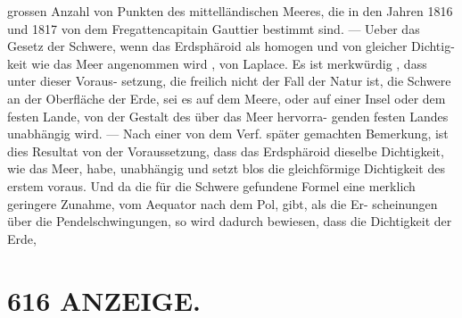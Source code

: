 \documentclass[12pt,a4paper]{article}
\begin{document}
{{{{{{{{grossen  Anzahl  von  Punkten  des mittelländischen  Meeres,  die  in  den  Jahren  1816  und  1817  von  dem  Fregattencapitain  Gauttier  bestimmt sind.  ---  Ueber  das  Gesetz  der  Schwere,  wenn  das  Erdsphäroid  als  homogen  und  von  gleicher  Dichtig- keit wie  das  Meer  angenommen  wird ,  von  Laplace.  Es  ist  merkwürdig ,  dass  unter  dieser  Voraus- setzung, die  freilich  nicht  der  Fall  der  Natur  ist,  die  Schwere  an  der  Oberfläche  der  Erde,  sei  es  auf dem  Meere,  oder  auf  einer  Insel  oder  dem  festen  Lande,  von  der  Gestalt  des  über  das  Meer  hervorra- genden festen  Landes  unabhängig  wird.  ---  Nach  einer  von  dem  Verf.  später  gemachten  Bemerkung, ist  dies  Resultat  von  der  Voraussetzung,  dass  das  Erdsphäroid  dieselbe  Dichtigkeit,  wie  das  Meer,  habe, unabhängig  und  setzt  blos  die  gleichförmige  Dichtigkeit  des  erstem  voraus.  Und  da  die  für  die  Schwere gefundene  Formel  eine  merklich  geringere  Zunahme,  vom  Aequator  nach  dem  Pol,  gibt,  als  die  Er- scheinungen über  die  Pendelschwingungen,   so    wird   dadurch   bewiesen,    dass  die  Dichtigkeit  der  Erde,


\section*{616  ANZEIGE.}

}}}}}}}}
\end{document}

